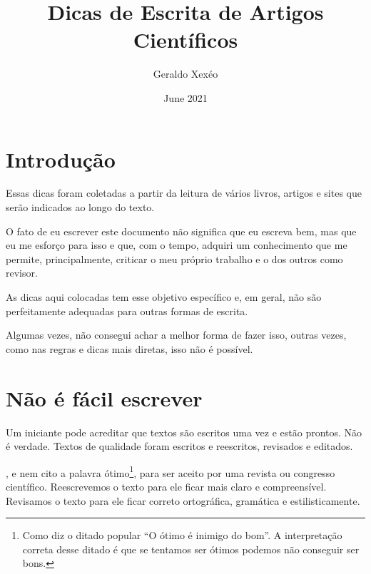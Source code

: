 \documentclass{article}
\title{Dicas de Escrita de Artigos Científicos}
\author{Geraldo Xexéo}
\date{June 2021}
\begin{document}
\maketitle

\tableofcontents

\section{Introdução}
 Essas dicas foram coletadas a partir da leitura de vários livros, artigos e sites que serão indicados ao longo do texto. 

O fato de eu escrever este documento não significa que eu escreva bem, mas que eu me esforço para isso e que, com o tempo, adquiri um conhecimento que me permite, principalmente, criticar o meu próprio trabalho e o dos outros como revisor. 

As dicas aqui colocadas tem esse objetivo específico e, em geral, não são perfeitamente adequadas para outras formas de escrita.

 Algumas vezes, não consegui achar a melhor forma de fazer isso, outras vezes, como nas regras e dicas mais diretas, isso não é possível. 

\section{Não é fácil escrever}

 Um iniciante pode acreditar que textos são escritos uma vez e estão prontos. Não é verdade. Textos de qualidade foram escritos e reescritos, revisados e editados. 

, e nem cito a palavra ótimo\footnote{Como diz o ditado popular ``O ótimo é inimigo do bom''. A interpretação correta desse ditado é que se tentamos ser ótimos podemos não conseguir ser bons.}, para ser aceito por uma revista ou congresso científico. Reescrevemos o texto para ele ficar mais claro e  compreensível. Revisamos o texto para ele ficar correto ortográfica, gramática e estilisticamente.
\end{document}
